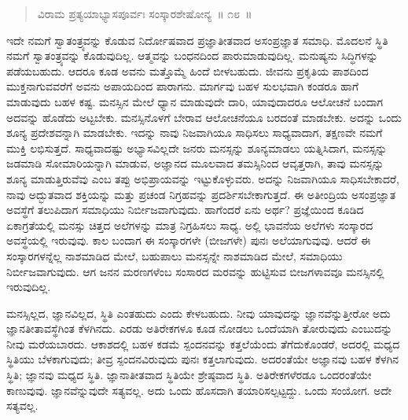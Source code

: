 \vspace{-0.42cm}

\begin{verse}
ವಿರಾಮ ಪ್ರತ್ಯಯಾಭ್ಯಾಸಪೂರ್ವಃ ಸಂಸ್ಕಾರಶೇಷೋನ್ಯ~॥ ೧೮~॥
\end{verse}

\vspace{-0.57cm}


\vspace{0.05cm}

ಇದೇ ನಮಗೆ ಸ್ವಾತಂತ್ರ್ಯವನ್ನು ಕೊಡುವ ನಿರ್ದೋಷವಾದ ಪ್ರಜ್ಞಾತೀತವಾದ ಅಸಂಪ್ರ\break ಜ್ಞಾತ ಸಮಾಧಿ. ಮೊದಲನೆ ಸ್ಥಿತಿ ನಮಗೆ ಸ್ವಾತಂತ್ರ್ಯವನ್ನು ಕೊಡುವುದಿಲ್ಲ. ಆತ್ಮವನ್ನು ಬಂಧನದಿಂದ ಪಾರುಮಾಡುವುದಿಲ್ಲ. ಮನುಷ್ಯನು ಸಿದ್ಧಿಗಳನ್ನು ಪಡೆಯಬಹುದು. ಆದರೂ ಕೂಡ ಅವನು ಮತ್ತೊಮ್ಮೆ ಹಿಂದೆ ಬೀಳಬಹುದು. ಜೀವನು ಪ್ರಕೃತಿಯ ಪಾಶದಿಂದ ಮುಕ್ತನಾಗುವವರೆಗೆ ಅವನು ಅಪಾಯದಿಂದ ಪಾರಾಗನು. ಮಾರ್ಗವು ಬಹಳ ಸುಲಭವಾಗಿ ಕಂಡರೂ ಹಾಗೆ ಮಾಡುವುದು ಬಹಳ ಕಷ್ಟ. ಮನಸ್ಸಿನ ಮೇಲೆ ಧ್ಯಾನ ಮಾಡುವುದೇ ದಾರಿ, ಯಾವುದಾದರೂ ಆಲೋಚನೆ ಬಂದಾಗ ಅದವನ್ನು ಹೊಡೆದು ಅಟ್ಟಬೇಕು. ಮನಸ್ಸಿ\break ನೊಳಗೆ ಬೇರಾವ ಆಲೋಚನೆಯೂ ಬರದಂತೆ ಮಾಡಬೇಕು. ಅದನ್ನು ಒಂದು ಶೂನ್ಯ ಪ್ರದೇಶವನ್ನಾಗಿ ಮಾಡಬೇಕು. ಇದನ್ನು ನಾವು ನಿಜವಾಗಿಯೂ ಸಾಧಿಸಲು ಸಾಧ್ಯವಾದಾಗ, ತಕ್ಷಣವೇ ನಮಗೆ ಮುಕ್ತಿ ಲಭಿಸುತ್ತದೆ. ಸಾಧ್ಯವಾದಷ್ಟು ಅಭ್ಯಾಸವಿಲ್ಲದೇ ಜನರು ಮನಸ್ಸನ್ನು ಶೂನ್ಯಮಾಡಲು ಯತ್ನಿಸಿದಾಗ, ಮನಸ್ಸನ್ನು ಜಡಮಾಡಿ ಸೋಮಾರಿಯನ್ನಾಗಿ ಮಾಡುವ, ಅಜ್ಞಾನದ ಮೂಲವಾದ ತಮಸ್ಸಿನಿಂದ ಆವೃತ್ತರಾಗಿ, ತಾವು ಮನಸ್ಸನ್ನು ಶೂನ್ಯ ಮಾಡುತ್ತಿರು\-ವೆವು ಎಂಬ ತಪ್ಪು ಅಭಿಪ್ರಾಯವನ್ನು ಇಟ್ಟುಕೊಳ್ಳುವರು. ಅದನ್ನು ನಿಜವಾಗಿಯೂ ಸಾಧಿಸಬೇಕಾದರೆ, ನಾವು ಅದ್ಭುತವಾದ ಶಕ್ತಿಯನ್ನು ಮತ್ತು ಪ್ರಚಂಡ ನಿಗ್ರಹವನ್ನು ಪ್ರದರ್ಶಿಸಬೇಕಾಗುತ್ತದೆ. ಈ ಅತೀಂದ್ರಿಯ ಅಸಂಪ್ರಜ್ಞಾತ ಅವಸ್ಥೆಗೆ ತಲುಪಿದಾಗ ಸಮಾಧಿಯು ನಿರ್ಬೀಜವಾಗುವುದು. ಹಾಗೆಂದರೆ ಏನು ಅರ್ಥ? ಪ್ರಜ್ಞೆಯಿಂದ ಕೂಡಿದ ಏಕಾಗ್ರತೆಯಲ್ಲಿ ಮನಸ್ಸು ಚಿತ್ತದ ಅಲೆಗಳನ್ನು ಮಾತ್ರ ನಿಗ್ರಹಿಸಲು ಸಾಧ್ಯ. ಅಲ್ಲಿ ಭಾವನೆಯ ಅಲೆಗಳು ಸಂಸ್ಕಾರದ ಅವಸ್ಥೆಯಲ್ಲಿ ಇರುವುವು. ಕಾಲ ಬಂದಾಗ ಈ ಸಂಸ್ಕಾರಗಳೇ (ಬೀಜಗಳೇ) ಪುನಃ ಅಲೆಯಾಗುವುವು. ಆದರೆ ಈ ಸಂಸ್ಕಾರಗಳನ್ನೆಲ್ಲ ನಾಶಮಾಡಿದ ಮೇಲೆ, ಬಹುಪಾಲು ಮನಸ್ಸನ್ನೇ ನಾಶಮಾಡಿದ ಮೇಲೆ, ಸಮಾಧಿಯು ನಿರ್ಬೀಜವಾಗುವುದು. ಆಗ ಜನನ ಮರಣಗಳೆಂಬ ಸಂಸಾರದ ಮರವನ್ನು ಹುಟ್ಟಿಸುವ ಬೀಜಗಳಾವವೂ ಮನಸ್ಸಿನಲ್ಲಿ ಇರುವುದಿಲ್ಲ. 

ಮನಸ್ಸಿಲ್ಲದ, ಜ್ಞಾನವಿಲ್ಲದ, ಸ್ಥಿತಿ ಎಂತಹುದು ಎಂದು ಕೇಳಬಹುದು. ನೀವು ಯಾವುದನ್ನು ಜ್ಞಾನವೆನ್ನುತ್ತೀರೋ ಅದು ಜ್ಞಾನತೀತಾವಸ್ಥೆಗಿಂತ ಕೆಳಗಿನದು. ಎರಡು ಅತಿರೇಕಗಳೂ ಕೂಡ ನೋಡಲು ಒಂದೆಯಾಗಿ ತೋರುವುದು ಎಂಬುದನ್ನು ನೀವು ಮರೆಯಬಾರದು. ಆಕಾಶದಲ್ಲಿ ಬಹಳ ಕಡಮೆ ಸ್ಪಂದನವನ್ನು ಕತ್ತಲೆಯೆಂದು ತೆಗೆದುಕೊಂಡರೆ, ಅದರಲ್ಲಿ ಮಧ್ಯದ ಸ್ಥಿತಿಯು ಬೆಳಕಾಗುವುದು; ತೀವ್ರ ಸ್ಪಂದನವಿರುವುದು ಪುನಃ ಕತ್ತಲಾಗುವುದು. ಅದರಂತೆಯೇ ಅಜ್ಞಾನವು ಬಹಳ ಕೆಳಗಿನ ಸ್ಥಿತಿ; ಜ್ಞಾನವು ಮಧ್ಯದ ಸ್ಥಿತಿ. ಜ್ಞಾನಾತೀತವಾದ ಸ್ಥಿತಿಯೇ ಶ್ರೇಷ್ಠವಾದ ಸ್ಥಿತಿ. ಅತಿರೇಕಗಳೆರಡೂ ಒಂದರಂತೆಯೇ ಕಾಣುವುವು. ಜ್ಞಾನವೆನ್ನುವುದೇ ಸತ್ಯವಲ್ಲ. ಅದು ಒಂದು ಹೊಸದಾಗಿ ತಯಾರಿಸಲ್ಪಟ್ಟದ್ದು. ಒಂದು ಸಂಯೋಗ. ಅದೇ ಸತ್ಯವಲ್ಲ. 

